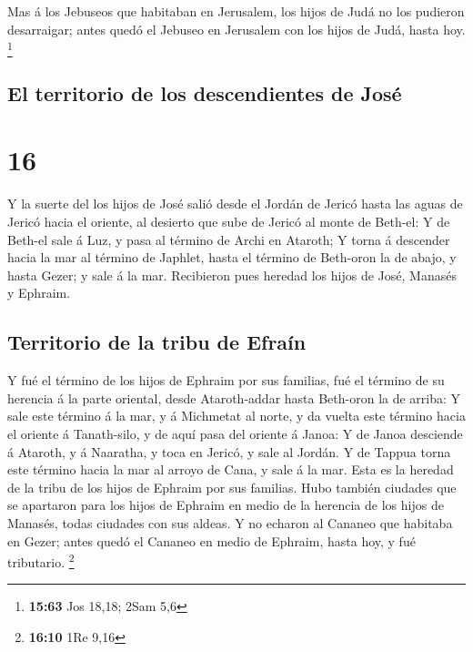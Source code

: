  Mas á los Jebuseos que habitaban en Jerusalem, los hijos
de Judá no los pudieron desarraigar; antes quedó el Jebuseo en Jerusalem
con los hijos de Judá, hasta hoy. \footnote{\textbf{15:63} Jos 18,18;
  2Sam 5,6}

\hypertarget{el-territorio-de-los-descendientes-de-josuxe9}{%
\subsection{El territorio de los descendientes de
José}\label{el-territorio-de-los-descendientes-de-josuxe9}}

\hypertarget{section-15}{%
\section{16}\label{section-15}}

 Y la suerte del los hijos de José salió desde el Jordán de
Jericó hasta las aguas de Jericó hacia el oriente, al desierto que sube
de Jericó al monte de Beth-el:  Y de Beth-el sale á Luz, y
pasa al término de Archi en Ataroth;  Y torna á descender
hacia la mar al término de Japhlet, hasta el término de Beth-oron la de
abajo, y hasta Gezer; y sale á la mar.  Recibieron pues
heredad los hijos de José, Manasés y Ephraim.

\hypertarget{territorio-de-la-tribu-de-efrauxedn}{%
\subsection{Territorio de la tribu de
Efraín}\label{territorio-de-la-tribu-de-efrauxedn}}

 Y fué el término de los hijos de Ephraim por sus familias,
fué el término de su herencia á la parte oriental, desde Ataroth-addar
hasta Beth-oron la de arriba:  Y sale este término á la mar,
y á Michmetat al norte, y da vuelta este término hacia el oriente á
Tanath-silo, y de aquí pasa del oriente á Janoa:  Y de Janoa
desciende á Ataroth, y á Naaratha, y toca en Jericó, y sale al Jordán.
 Y de Tappua torna este término hacia la mar al arroyo de
Cana, y sale á la mar. Esta es la heredad de la tribu de los hijos de
Ephraim por sus familias.  Hubo también ciudades que se
apartaron para los hijos de Ephraim en medio de la herencia de los hijos
de Manasés, todas ciudades con sus aldeas.  Y no echaron al
Cananeo que habitaba en Gezer; antes quedó el Cananeo en medio de
Ephraim, hasta hoy, y fué tributario. \footnote{\textbf{16:10} 1Re 9,16}

